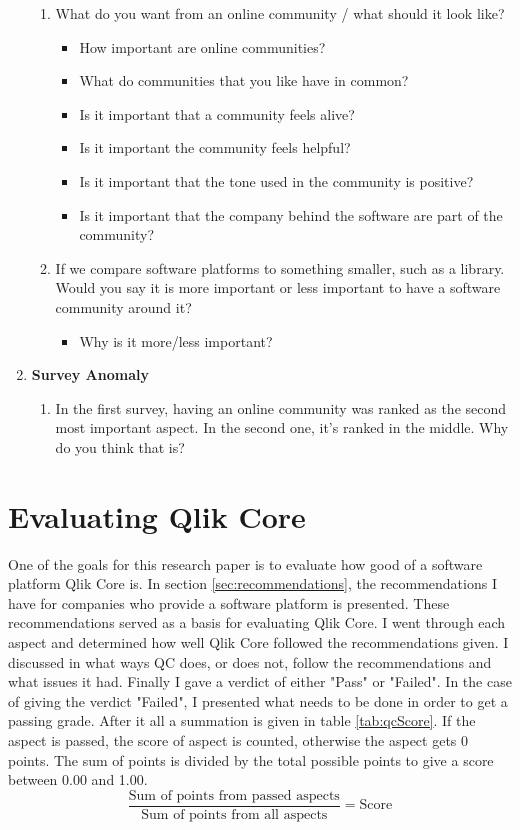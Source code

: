 \documentclass{cslthse-msc}
\begin{document}
\begin{enumerate}[label=C\Alph*]
        \begin{enumerate}[label=CC\arabic*]
            \item	What do you want from an online community / what should it look like?
            \begin{itemize}[label={-}]
                \item How important are online communities?
                \item What do communities that you like have in common?
                \item Is it important that a community feels alive?
                \item Is it important the community feels helpful?
                \item Is it important that the tone used in the community is positive?
                \item Is it important that the company behind the software are part of the community?
            \end{itemize}
            \item	If we compare software platforms to something smaller, such as a library. Would you say it is more important or less important to have a software community around it?
            \begin{itemize}[label={-}]
                \item Why is it more/less important?
            \end{itemize}
        \end{enumerate}
        \item \textbf{Survey Anomaly}
        \begin{enumerate}[label={CD\arabic*}]
            \item In the first survey, having an online community was ranked as the second most important aspect. In the second one, it’s ranked in the middle. Why do you think that is?
        \end{enumerate}
    \end{enumerate}

    \section{Evaluating Qlik Core}
    One of the goals for this research paper is to evaluate how good of a software platform Qlik Core is. In section \ref{sec:recommendations}, the recommendations I have for companies who provide a software platform is presented. These recommendations served as a basis for evaluating Qlik Core. I went through each aspect and determined how well Qlik Core followed the recommendations given. I discussed in what ways QC does, or does not, follow the recommendations and what issues it had. Finally I gave a verdict of either "Pass" or "Failed". In the case of giving the verdict "Failed", I presented what needs to be done in order to get a passing grade. After it all a summation is given in table \ref{tab:qcScore}. If the aspect is passed, the score of aspect is counted, otherwise the aspect gets 0 points. The sum of points is divided by the total possible points to give a score between 0.00 and 1.00.
    \[
        \frac{\text{Sum of points from passed aspects}}{\text{Sum of points from all aspects}} = \text{Score}
    \]
\end{document}
